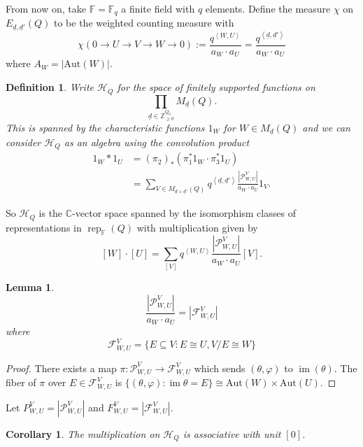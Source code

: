 \documentclass{book}
\newtheorem{lemma}[theorem]{Lemma}
\newtheorem{corollary}[theorem]{Corollary}
\newtheorem{definition}[theorem]{Definition}
\DeclareMathOperator{\rep}{rep}
\DeclareMathOperator{\im}{im}
\begin{document}
    From now on, take $\mathbb{F}=\mathbb{F}_q$ a finite field with $q$ elements. Define the measure $\chi$ on $E_{\underline{d},\underline{d}'}(Q)$ to be the weighted counting measure with 
    \[\chi\left(0\to U\to  V\to W\to 0\right):=\frac{q^{\left<W,U\right>}}{a_W \cdot a_U}=\frac{q^{\left<\underline{d},\underline{d}'\right>}}{a_W\cdot a_U} \]
    where $A_W=|\text{Aut}(W)|$.
    
    \begin{definition}
        Write $\mathcal{H}_Q$ for the space of finitely supported functions on \[\prod_{\underline{d}\in\mathbb{Z}_{\geq 0}^{Q_0}} M_{\underline{d}}(Q).\] This is spanned by the characteristic functions $1_W$ for $W\in M_{\underline{d}}(Q)$ and we can consider $\mathcal{H}_Q$ as an algebra using the convolution product
        \begin{align*}
            1_W*1_U &= (\pi_2)_*(\pi_1^*1_W\cdot \pi_3^*1_U)\\
            &= \sum_{V\in M_{\underline{d}+\underline{d}'}(Q)}q^{\left<\underline{d},\underline{d}'\right>}\frac{|\mathcal{P}_{W,U}^V|}{a_W\cdot a_U}1_V.
        \end{align*}
    \end{definition}
    
    So $\mathcal{H}_Q$ is the $\mathbb{C}$-vector space spanned by the isomorphism classes of representations in $\rep_\mathbb{F}(Q)$ with multiplication given by
    \[[W]\cdot[U]=\sum_{[V]}q^{\left<W,U\right>}\frac{|\mathcal{P}_{W,U}^V|}{a_W\cdot a_U}[V].\]
    
    \begin{lemma}
    	\[\frac{|\mathcal{P}_{W,U}^V|}{a_W\cdot a_U}=|\mathcal{F}_{W,U}^V|\] where \[\mathcal{F}_{W,U}^V=\{E\subseteq V : E\cong U, V/E \cong W\}\]
    \end{lemma}
    \begin{proof}
    	There exists a map $\pi:\mathcal{P}_{W,U}^V\to\mathcal{F}_{W,U}^V$ which sends $(\theta,\varphi)$ to $\im(\theta)$. The fiber of $\pi$ over $E\in \mathcal{F}_{W,U}^V$ is $\{(\theta,\varphi):\im\theta = E\}\cong\text{Aut}(W)\times\text{Aut}(U)$.
    \end{proof}
    
    Let $P_{W,U}^V=|\mathcal{P}_{W,U}^V|$ and $F_{W,U}^V=|\mathcal{F}_{W,U}^V|$.
    
    \begin{corollary}
        The multiplication on $\mathcal{H}_Q$ is associative with unit $[0]$.
    \end{corollary}
    
\end{document}
